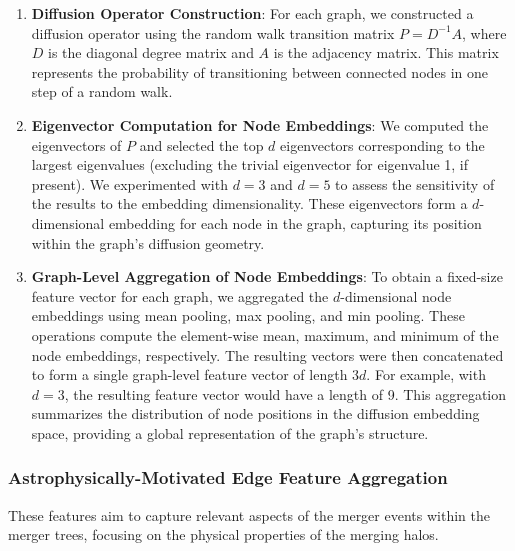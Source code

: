 \documentclass[twocolumn]{aastex631}
\begin{document}
\begin{enumerate}
    \item \textbf{Diffusion Operator Construction}: For each graph, we constructed a diffusion operator using the random walk transition matrix $P = D^{-1}A$, where $D$ is the diagonal degree matrix and $A$ is the adjacency matrix. This matrix represents the probability of transitioning between connected nodes in one step of a random walk.

    \item \textbf{Eigenvector Computation for Node Embeddings}: We computed the eigenvectors of $P$ and selected the top $d$ eigenvectors corresponding to the largest eigenvalues (excluding the trivial eigenvector for eigenvalue 1, if present). We experimented with $d=3$ and $d=5$ to assess the sensitivity of the results to the embedding dimensionality. These eigenvectors form a $d$-dimensional embedding for each node in the graph, capturing its position within the graph's diffusion geometry.

    \item \textbf{Graph-Level Aggregation of Node Embeddings}: To obtain a fixed-size feature vector for each graph, we aggregated the $d$-dimensional node embeddings using mean pooling, max pooling, and min pooling. These operations compute the element-wise mean, maximum, and minimum of the node embeddings, respectively. The resulting vectors were then concatenated to form a single graph-level feature vector of length $3d$. For example, with $d=3$, the resulting feature vector would have a length of 9. This aggregation summarizes the distribution of node positions in the diffusion embedding space, providing a global representation of the graph's structure.
\end{enumerate}

\subsubsection{Astrophysically-Motivated Edge Feature Aggregation}
These features aim to capture relevant aspects of the merger events within the merger trees, focusing on the physical properties of the merging halos.
\end{document}
